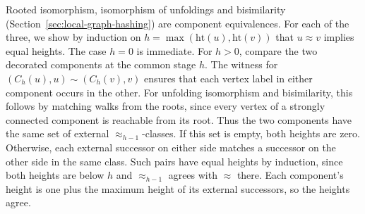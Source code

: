 \documentclass[twoside,leqno]{article}
\newcommand{\hgt}{\mathrm{ht}}
\begin{document}
Rooted isomorphism, isomorphism of unfoldings and bisimilarity (Section~\ref{sec:local-graph-hashing}) are component equivalences. For each of the three, we show by induction on $h=\max(\hgt(u),\hgt(v))$ that $u\approx v$ implies equal heights. The case $h=0$ is immediate. For $h>0$, compare the two decorated components at the common stage $h$. The witness for $(C_h(u),u)\sim(C_h(v),v)$ ensures that each vertex label in either component occurs in the other. For unfolding isomorphism and bisimilarity, this follows by matching walks from the roots, since every vertex of a strongly connected component is reachable from its root. Thus the two components have the same set of external $\approx_{h-1}$-classes. If this set is empty, both heights are zero. Otherwise, each external successor on either side matches a successor on the other side in the same class. Such pairs have equal heights by induction, since both heights are below $h$ and $\approx_{h-1}$ agrees with $\approx$ there. Each component's height is one plus the maximum height of its external successors, so the heights agree.
\end{document}
